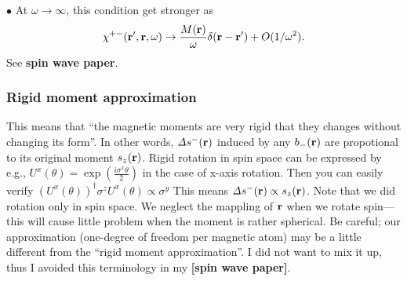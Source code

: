 \documentclass[a4paper,10pt,epsf,fleqn]{article}
\newcommand{\bfr}{{\bf r}}
\newcommand{\ds}{\displaystyle}
\newcommand{\D}{{\it \Delta}}
\newcommand{\scgw}{QS{\it GW} }
\newcommand{\figs}[2]{\hspace{-2cm}\rotatebox{0}{\texttt{[image: \#1]}}\rotatebox{0}{\texttt{[image: \#2]}}}
\begin{document}
\noindent $\bullet$ At $\omega \to \infty$, this condition get stronger as
\begin{eqnarray}
\chi^{+-}(\bfr',\bfr,\omega) \to
\frac{M(\bfr)}{\omega} \delta(\bfr-\bfr') + O(1/\omega^2).
\label{summ2}
\end{eqnarray}
See {\bf spin wave paper}.


\subsubsection{Rigid moment approximation} 
This means that ``the magnetic moments are very rigid that they
changes without changing its form''. 
In other words, $\D s^-(\bfr)$ induced by any $b_-(\bfr)$ 
are propotional to its original moment $s_z(\bfr)$.
Rigid rotation in spin space can be expressed by e.g.,
$\ds U^x(\theta)=\exp\left( \frac{i \sigma^x \theta}{2}\right)$ in the case of x-axis rotation.
Then you can easily verify
$(U^x(\theta))^\dagger \sigma^z U^x(\theta) \propto \sigma^y$
This means $\D s^-(\bfr) \propto s_z(\bfr)$. 
Note that we did rotation only in spin space.
We neglect the mappling of $\bfr$ when we rotate spin---this will cause
little problem when the moment is rather spherical.
Be careful; our approximation (one-degree of freedom per magnetic atom) 
may be a little different from the ``rigid moment approximation''.
I did not want to mix it up, thus I avoided this terminology in my {\bf [spin wave paper]}.







\end{document}
